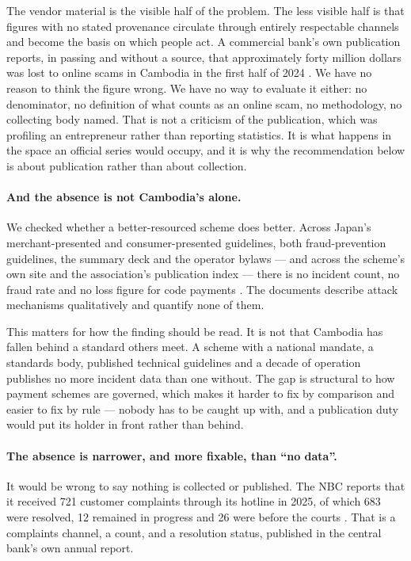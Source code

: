 \documentclass[10pt,a4paper,twocolumn]{article}
\begin{document}
The vendor material is the visible half of the problem. The less visible half is
that figures with no stated provenance circulate through entirely respectable
channels and become the basis on which people act. A commercial bank's own
publication reports, in passing and without a source, that approximately forty
million dollars was lost to online scams in Cambodia in the first half of 2024
\citep{wingbank2025espass}. We have no reason to think the figure wrong. We have
no way to evaluate it either: no denominator, no definition of what counts as an
online scam, no methodology, no collecting body named. That is not a criticism
of the publication, which was profiling an entrepreneur rather than reporting
statistics. It is what happens in the space an official series would occupy, and
it is why the recommendation below is about publication rather than about
collection.

\paragraph{And the absence is not Cambodia's alone.} We checked whether a
better-resourced scheme does better. Across Japan's merchant-presented and
consumer-presented guidelines, both fraud-prevention guidelines, the summary
deck and the operator bylaws --- and across the scheme's own site and the
association's publication index --- there is no incident count, no fraud rate and
no loss figure for code payments \citep{jpqrmpm,jpqrfraud,jpqrcard}. The
documents describe attack mechanisms qualitatively and quantify none of them.

This matters for how the finding should be read. It is not that Cambodia has
fallen behind a standard others meet. A scheme with a national mandate, a
standards body, published technical guidelines and a decade of operation
publishes no more incident data than one without. The gap is structural to how
payment schemes are governed, which makes it harder to fix by comparison and
easier to fix by rule --- nobody has to be caught up with, and a publication duty
would put its holder in front rather than behind.

\paragraph{The absence is narrower, and more fixable, than ``no data''.} It
would be wrong to say nothing is collected or published. The NBC reports that it
received 721 customer complaints through its hotline in 2025, of which 683 were
resolved, 12 remained in progress and 26 were before the courts
\citep{nbc2025annual}. That is a complaints channel, a count, and a resolution
status, published in the central bank's own annual report.
\end{document}
